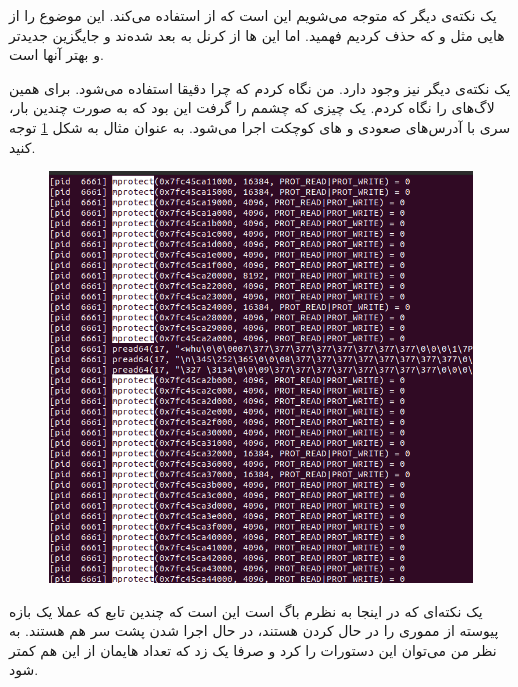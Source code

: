 یک نکته‌ی دیگر که متوجه می‌شویم این است که
 از
استفاده می‌کند. این موضوع را از
هایی
مثل
 و 
که حذف کردیم فهمید. اما این
ها
از کرنل
به بعد
شده‌ند و جایگزین جدید‌تر و بهتر آنها
است.

یک نکته‌ی دیگر نیز وجود دارد. من نگاه کردم که
چرا دقیقا استفاده می‌شود. برای همین لاگ‌های
را نگاه کردم. یک چیزی که چشمم را گرفت این بود که
به صورت چندین بار، سری با آدرس‌های صعودی و
های
کوچکت اجرا می‌شود. به عنوان مثال به شکل
\ref{fig:mysql:results:mprotect}
توجه کنید.
\begin{figure}[H]
    \centering
    \includegraphics[scale=0.4]{pictures/mysql/results/mprotect.png}
    \caption{}
    \label{fig:mysql:results:mprotect}
\end{figure}
یک نکته‌ای که در اینجا به نظرم باگ است این است که چندین تابع
که عملا یک بازه پیوسته از مموری را در حال
کردن هستند، در حال اجرا شدن پشت سر هم هستند. به نظر من می‌توان این دستورات را
کرد و صرفا یک
زد که تعداد
هایمان
از این هم کمتر شود.

